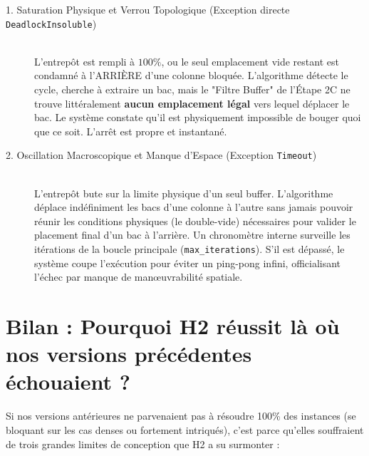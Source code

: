 \documentclass[11pt,a4paper]{article}
\begin{document}
\begin{description}
    \item[1. Saturation Physique et Verrou Topologique (Exception directe \texttt{DeadlockInsoluble})]\hfill \\
    L'entrepôt est rempli à $100\%$, ou le seul emplacement vide restant est condamné à l'ARRIÈRE d'une colonne bloquée. L'algorithme détecte le cycle, cherche à extraire un bac, mais le "Filtre Buffer" de l'Étape 2C ne trouve littéralement \textbf{aucun emplacement légal} vers lequel déplacer le bac. Le système constate qu'il est physiquement impossible de bouger quoi que ce soit. L'arrêt est propre et instantané.
    
    \item[2. Oscillation Macroscopique et Manque d'Espace (Exception \texttt{Timeout})]\hfill \\
    L'entrepôt bute sur la limite physique d'un seul buffer. L'algorithme déplace indéfiniment les bacs d'une colonne à l'autre sans jamais pouvoir réunir les conditions physiques (le double-vide) nécessaires pour valider le placement final d'un bac à l'arrière. Un chronomètre interne surveille les itérations de la boucle principale (\texttt{max\_iterations}). S'il est dépassé, le système coupe l'exécution pour éviter un ping-pong infini, officialisant l'échec par manque de manœuvrabilité spatiale.
\end{description}

\section{Bilan : Pourquoi H2 réussit là où nos versions précédentes échouaient ?}

Si nos versions antérieures ne parvenaient pas à résoudre 100\% des instances (se bloquant sur les cas denses ou fortement intriqués), c'est parce qu'elles souffraient de trois grandes limites de conception que H2 a su surmonter :
\end{document}

